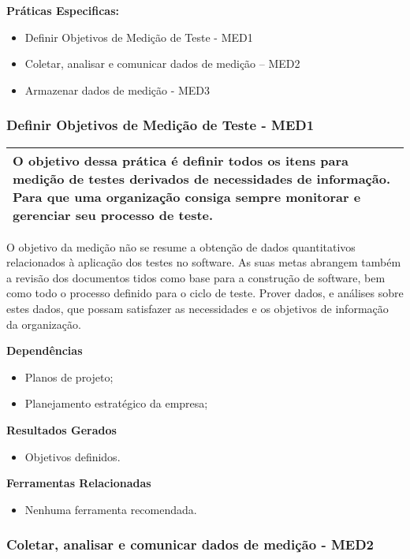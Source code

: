 \textbf{Práticas Especificas: }
\begin{itemize}
    \item Definir Objetivos de Medição de Teste - MED1
    \item Coletar, analisar e comunicar dados de medição – MED2
    \item Armazenar dados de medição - MED3
\end{itemize}

\subsubsection{Definir Objetivos de Medição de Teste - MED1}
\label{sec:med1}

\begin{table}[!ht]
\centering
\begin{tabular}{|p{130mm}|}
\hline
O objetivo dessa prática é definir todos os itens para medição de testes derivados de necessidades de informação. Para que uma organização consiga sempre monitorar e gerenciar seu processo de teste. \\ 
\hline
\end{tabular}
\end{table}

O objetivo da medição não se resume a obtenção de dados quantitativos relacionados à aplicação dos testes no software. As suas metas abrangem também a revisão dos documentos tidos como base para a construção de software, bem como todo o processo definido para o ciclo de teste. Prover dados, e análises sobre estes dados, que possam satisfazer as necessidades e os objetivos de informação da organização.

\textbf{ Dependências}
\begin{itemize}
    \item Planos de projeto;
    \item Planejamento estratégico da empresa;
\end{itemize}

\textbf{Resultados Gerados }
\begin{itemize}
    \item Objetivos definidos.
\end{itemize}

\textbf{Ferramentas Relacionadas }
\begin{itemize}
    \item Nenhuma ferramenta recomendada.
\end{itemize}

\subsubsection{Coletar, analisar e comunicar dados de medição - MED2}
\label{sec:med2}

